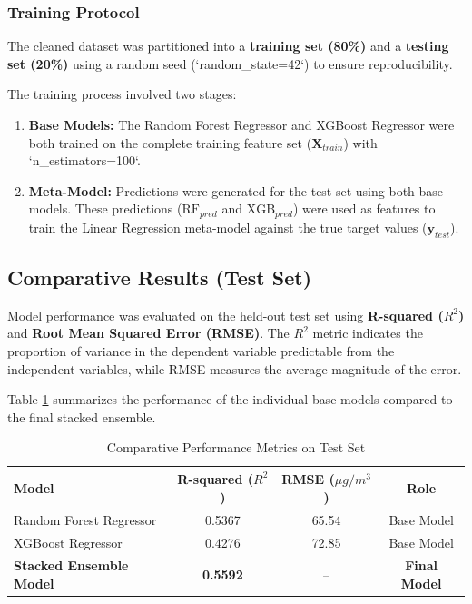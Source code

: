 \documentclass[12pt, a4paper]{article}
\begin{document}
\subsubsection{Training Protocol}
The cleaned dataset was partitioned into a \textbf{training set (80\%)} and a \textbf{testing set (20\%)} using a random seed (`random\_state=42`) to ensure reproducibility.

The training process involved two stages:
\begin{enumerate}
    \item \textbf{Base Models:} The Random Forest Regressor and XGBoost Regressor were both trained on the complete training feature set ($\mathbf{X}_{train}$) with `n\_estimators=100`.
    \item \textbf{Meta-Model:} Predictions were generated for the test set using both base models. These predictions ($\text{RF}_{pred}$ and $\text{XGB}_{pred}$) were used as features to train the Linear Regression meta-model against the true target values ($\mathbf{y}_{test}$).
\end{enumerate}

\subsection{Comparative Results (Test Set)}
Model performance was evaluated on the held-out test set using \textbf{R-squared ($R^2$)} and \textbf{Root Mean Squared Error (RMSE)}. The $R^2$ metric indicates the proportion of variance in the dependent variable predictable from the independent variables, while RMSE measures the average magnitude of the error.

Table \ref{tab:results} summarizes the performance of the individual base models compared to the final stacked ensemble.

\begin{table}[H]
    \centering
    \caption{Comparative Performance Metrics on Test Set}
    \label{tab:results}
    \begin{tabular}{lccc}
        \toprule
        \textbf{Model} & \textbf{R-squared ($R^2$)} & \textbf{RMSE ($\mu g/m^3$)} & \textbf{Role} \\
        \midrule
        Random Forest Regressor & 0.5367 & 65.54 & Base Model \\
        XGBoost Regressor & 0.4276 & 72.85 & Base Model \\
        \textbf{Stacked Ensemble Model} & \textbf{0.5592} & -- & \textbf{Final Model} \\
        \bottomrule
    \end{tabular}
\end{table}
\end{document}

